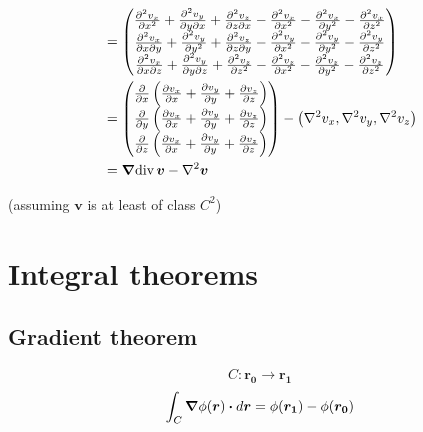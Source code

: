 \documentclass{article}
\renewcommand{\vec}[1]{\boldsymbol{#1}}
\begin{document}
\begin{align*}
    &= \begin{pmatrix} \frac{\partial^{2} { v_x }}{\partial{ x^{2} }} + \frac{\partial^{2} { v_y }}{\partial{ y \partial{ x } }} + \frac{\partial^{2} { v_z }}{\partial{ z \partial{ x } }} - \frac{\partial^{2} { v_x }}{\partial{ x^{2} }} - \frac{\partial^{2} { v_x }}{\partial{ y^{2} }} - \frac{\partial^{2} { v_x }}{\partial{ z^{2} }} \\ \frac{\partial^{2} { v_x }}{\partial{ x \partial{ y } }} + \frac{\partial^{2} { v_y }}{\partial{ y^{2} }} + \frac{\partial^{2} { v_z }}{\partial{ z \partial{ y } }} - \frac{\partial^{2} { v_y }}{\partial{ x^{2} }} - \frac{\partial^{2} { v_y }}{\partial{ y^{2} }} - \frac{\partial^{2} { v_y }}{\partial{ z^{2} }} \\ \frac{\partial^{2} { v_x }}{\partial{ x \partial{ z } }} + \frac{\partial^{2} { v_y }}{\partial{ y \partial{ z } }} + \frac{\partial^{2} { v_z }}{\partial{ z^{2} }} - \frac{\partial^{2} { v_z }}{\partial{ x^{2} }} - \frac{\partial^{2} { v_z }}{\partial{ y^{2} }} - \frac{\partial^{2} { v_z }}{\partial{ z^{2} }} \end{pmatrix} \\
    &= \begin{pmatrix} \frac{\partial{  }}{\partial{ x }} \left( \frac{\partial{ v_x }}{\partial{ x }} + \frac{\partial{ v_y }}{\partial{ y }} + \frac{\partial{ v_z }}{\partial{ z }} \right) \\ \frac{\partial{  }}{\partial{ y }} \left( \frac{\partial{ v_x }}{\partial{ x }} + \frac{\partial{ v_y }}{\partial{ y }} + \frac{\partial{ v_z }}{\partial{ z }} \right) \\ \frac{\partial{  }}{\partial{ z }} \left( \frac{\partial{ v_x }}{\partial{ x }} + \frac{\partial{ v_y }}{\partial{ y }} + \frac{\partial{ v_z }}{\partial{ z }} \right) \end{pmatrix} - \left( \laplacian{v_x} , \laplacian{v_y} , \laplacian{v_z} \right) \\
    &= \grad{\text{div} \, \vec{v}} - \laplacian{\vec{v}}
\end{align*}

(assuming \( \vec{v} \) is at least of class \( C^{2} \))

\section{Integral theorems}

\subsection{Gradient theorem}
\[ C: \vec{r_0} \rightarrow \vec{r_1} \]
\[ \int_C \grad{\phi(\vec{r})} \vdot d\vec{r} = \phi(\vec{r_1}) - \phi(\vec{r_0}) \]
\end{document}
